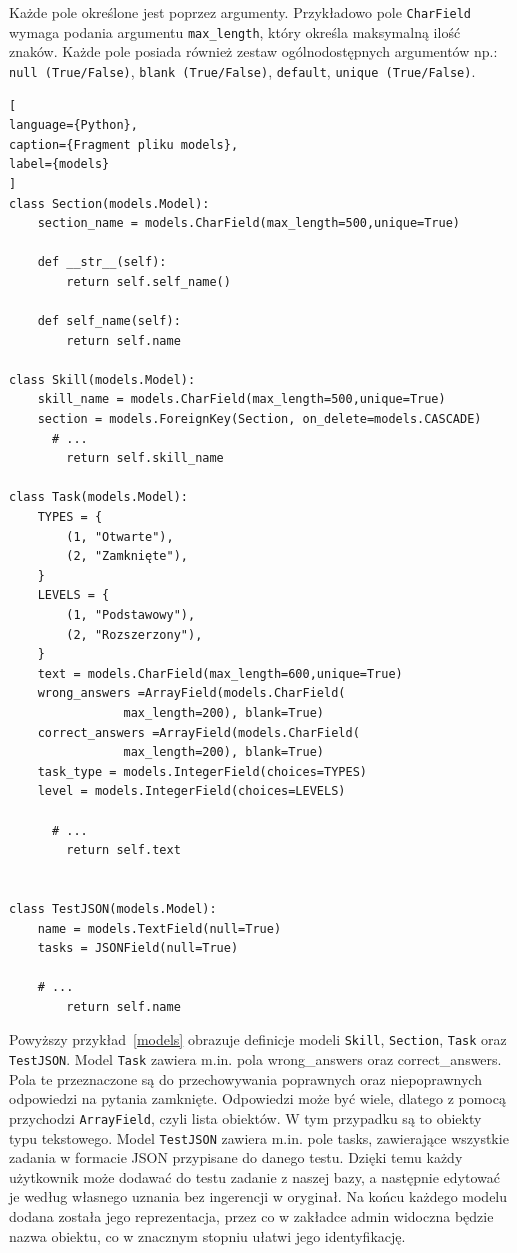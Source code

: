 \documentclass[oneside,polski,logo,indent]{amuthesis}
\begin{document}
Każde pole określone jest poprzez argumenty. Przykładowo pole \texttt{CharField} wymaga podania argumentu \texttt{max\_length}, który określa maksymalną ilość znaków. Każde pole posiada również zestaw ogólnodostępnych argumentów np.: \texttt{null (True/False)}, \texttt{blank (True/False)}, \texttt{default}, \texttt{unique (True/False)}.

\begin{lstlisting}[
language={Python},
caption={Fragment pliku models},
label={models}
]
class Section(models.Model):
    section_name = models.CharField(max_length=500,unique=True)

    def __str__(self):
        return self.self_name()

    def self_name(self):
        return self.name

class Skill(models.Model):
    skill_name = models.CharField(max_length=500,unique=True)
    section = models.ForeignKey(Section, on_delete=models.CASCADE)
	  # ...
        return self.skill_name

class Task(models.Model):
    TYPES = {
        (1, "Otwarte"),
        (2, "Zamknięte"),
    }
    LEVELS = {
        (1, "Podstawowy"),
        (2, "Rozszerzony"),
    }
    text = models.CharField(max_length=600,unique=True)
    wrong_answers =ArrayField(models.CharField(
				max_length=200), blank=True)
    correct_answers =ArrayField(models.CharField(
				max_length=200), blank=True)
    task_type = models.IntegerField(choices=TYPES)
    level = models.IntegerField(choices=LEVELS)

	  # ...
        return self.text


class TestJSON(models.Model):
    name = models.TextField(null=True)
    tasks = JSONField(null=True)

    # ...
        return self.name
\end{lstlisting}

Powyższy przykład~\ref{models} obrazuje definicje modeli \texttt{Skill}, \texttt{Section}, \texttt{Task} oraz \texttt{TestJSON}. 
Model \texttt{Task} zawiera m.in. pola wrong\_answers oraz correct\_answers. Pola te przeznaczone
są do przechowywania poprawnych oraz niepoprawnych odpowiedzi na pytania zamknięte. Odpowiedzi może być wiele, dlatego z pomocą
przychodzi \texttt{ArrayField}, czyli lista obiektów. W tym przypadku są to obiekty typu tekstowego.
Model \texttt{TestJSON} zawiera m.in. pole tasks, zawierające wszystkie zadania w formacie JSON przypisane do danego testu.
Dzięki temu każdy użytkownik może dodawać do testu zadanie z naszej bazy, a następnie edytować je według własnego uznania bez ingerencji
w oryginał.
Na końcu każdego modelu dodana została jego reprezentacja, przez co w zakładce admin widoczna będzie nazwa obiektu, co w znacznym stopniu ułatwi jego identyfikację.
\end{document}

